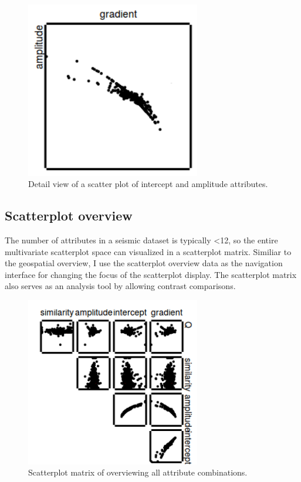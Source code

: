 \documentclass[journal]{vgtc}                %
\begin{document}
\begin{figure}[htb]
\centering
\includegraphics[width=3in]{crossplot}
\caption{Detail view of a scatter plot of intercept and amplitude attributes.}
\end{figure}

\subsection{Scatterplot overview}
The number of attributes in a seismic dataset is typically <12, so the entire multivariate scatterplot space
can visualized in a scatterplot matrix. Similiar to the geospatial overview, I use the scatterplot overview
data as the navigation interface for changing the focus of the scatterplot display. The scatterplot matrix also
serves as an analysis tool by allowing contrast comparisons.

\begin{figure}[htb]
\centering
\includegraphics[width=3in]{scatterplot_matrix}
\caption{Scatterplot matrix of overviewing all attribute combinations.}
\end{figure}
\end{document}

